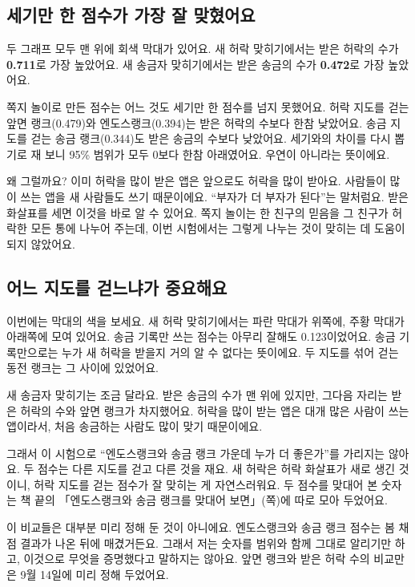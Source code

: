 \subsection*{세기만 한 점수가 가장 잘 맞혔어요}

두 그래프 모두 맨 위에 회색 막대가 있어요.
새 허락 맞히기에서는 받은 허락의 수가 \textbf{0.711}로 가장 높았어요.
새 송금자 맞히기에서는 받은 송금의 수가 \textbf{0.472}로 가장 높았어요.

쪽지 놀이로 만든 점수는 어느 것도 세기만 한 점수를 넘지 못했어요.
허락 지도를 걷는 앞면 랭크(0.479)와 엔도스랭크(0.394)는 받은 허락의 수보다 한참 낮았어요.
송금 지도를 걷는 송금 랭크(0.344)도 받은 송금의 수보다 낮았어요.
세기와의 차이를 다시 뽑기로 재 보니 95\% 범위가 모두 0보다 한참 아래였어요.
우연이 아니라는 뜻이에요.

왜 그럴까요?
이미 허락을 많이 받은 앱은 앞으로도 허락을 많이 받아요.
사람들이 많이 쓰는 앱을 새 사람들도 쓰기 때문이에요.
“부자가 더 부자가 된다”는 말처럼요.
받은 화살표를 세면 이것을 바로 알 수 있어요.
쪽지 놀이는 한 친구의 믿음을 그 친구가 허락한 모든 통에 나누어 주는데, 이번 시험에서는 그렇게 나누는 것이 맞히는 데 도움이 되지 않았어요.

\subsection*{어느 지도를 걷느냐가 중요해요}

이번에는 막대의 색을 보세요.
새 허락 맞히기에서는 파란 막대가 위쪽에, 주황 막대가 아래쪽에 모여 있어요.
송금 기록만 쓰는 점수는 아무리 잘해도 0.123이었어요.
송금 기록만으로는 누가 새 허락을 받을지 거의 알 수 없다는 뜻이에요.
두 지도를 섞어 걷는 동전 랭크는 그 사이에 있었어요.

새 송금자 맞히기는 조금 달라요.
받은 송금의 수가 맨 위에 있지만, 그다음 자리는 받은 허락의 수와 앞면 랭크가 차지했어요.
허락을 많이 받는 앱은 대개 많은 사람이 쓰는 앱이라서, 처음 송금하는 사람도 많이 맞기 때문이에요.

그래서 이 시험으로 “엔도스랭크와 송금 랭크 가운데 누가 더 좋은가”를 가리지는 않아요.
두 점수는 다른 지도를 걷고 다른 것을 재요.
새 허락은 허락 화살표가 새로 생긴 것이니, 허락 지도를 걷는 점수가 잘 맞히는 게 자연스러워요.
두 점수를 맞대어 본 숫자는 책 끝의 「엔도스랭크와 송금 랭크를 맞대어 보면」(\pageref{ch:er-awp-side}쪽)에 따로 모아 두었어요.

이 비교들은 대부분 미리 정해 둔 것이 아니에요.
엔도스랭크와 송금 랭크 점수는 봄 채점 결과가 나온 뒤에 매겼거든요.
그래서 저는 숫자를 범위와 함께 그대로 알리기만 하고, 이것으로 무엇을 증명했다고 말하지는 않아요.
앞면 랭크와 받은 허락 수의 비교만은 9월 14일에 미리 정해 두었어요.

